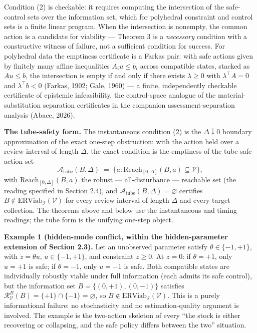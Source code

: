 \documentclass[11pt]{article}
\begin{document}
Condition (2) is checkable: it requires computing the intersection of
the safe-control sets over the information set, which for polyhedral
constraint and control sets is a finite linear program. When the
intersection is nonempty, the common action is a candidate for viability
--- Theorem 3 is a \emph{necessary} condition with a constructive
witness of failure, not a sufficient condition for success. For
polyhedral data the emptiness certificate is a Farkas pair: with safe
actions given by finitely many affine inequalities \(A_i u \le b_i\)
across compatible states, stacked as \(A u \le b\), the intersection is
empty if and only if there exists \(\lambda \ge 0\) with
\(\lambda^{\top} A = 0\) and \(\lambda^{\top} b < 0\) (Farkas, 1902;
Gale, 1960) --- a finite, independently checkable certificate of
epistemic infeasibility, the control-space analogue of the material-substitution separation certificates in the companion assessment-separation analysis (Abaee, 2026).

\textbf{The tube-safety form.} The instantaneous condition (2) is the
\(\Delta \downarrow 0\) boundary approximation of the exact one-step
obstruction: with the action held over a review interval of length
\(\Delta\), the exact condition is the emptiness of the tube-safe action
set
\[\mathcal{A}_{\mathrm{tube}}(B, \Delta) \;=\; \Big\{ a : \mathrm{Reach}_{[0,\Delta]}(B, a) \subseteq \mathcal{V} \Big\},\]
with \(\mathrm{Reach}_{[0,\Delta]}(B, a)\) the robust ---
all-disturbance --- reachable set (the reading specified in Section 2.4),
and \(\mathcal{A}_{\mathrm{tube}}(B, \Delta) = \varnothing\) certifies
\(B \notin \mathrm{ERViab}_{\mathcal{I}}(\mathcal{V})\) for every review
interval of length \(\Delta\) and every target collection. The theorems
above and below use the instantaneous and timing readings; the tube form
is the unifying one-step object.

\textbf{Example 1 (hidden-mode conflict, within the hidden-parameter
extension of Section 2.3).} Let an unobserved parameter satisfy
\(\theta \in \{-1, +1\}\), with \(\dot z = \theta u\),
\(u \in \{-1, +1\}\), and constraint \(z \ge 0\). At \(z = 0\): if
\(\theta = +1\), only \(u = +1\) is safe; if \(\theta = -1\), only
\(u = -1\) is safe. Both compatible states are individually robustly
viable under full information (each admits its safe control), but the
information set \(B = \{(0, +1), (0, -1)\}\) satisfies
\(\mathcal{R}_{\mathcal{V}}^B(B) = \{+1\} \cap \{-1\} = \varnothing\),
so \(B \notin \mathrm{ERViab}_{\mathcal{I}}(\mathcal{V})\). This is a
purely informational failure: no stochasticity and no estimation-quality
argument is involved. The example is the two-action skeleton of every
``the stock is either recovering or collapsing, and the safe policy
differs between the two'' situation.
\end{document}
